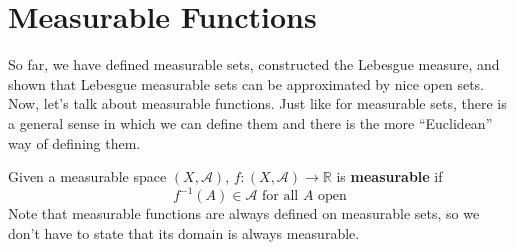 \section{Measurable Functions}

  So far, we have defined measurable sets, constructed the Lebesgue measure, and shown that Lebesgue measurable sets can be approximated by nice open sets. Now, let's talk about measurable functions. Just like for measurable sets, there is a general sense in which we can define them and there is the more ``Euclidean'' way of defining them. 

  \begin{definition}
    Given a measurable space $(X, \mathcal{A})$, $f: (X, \mathcal{A}) \longrightarrow \mathbb{R}$ is \textbf{measurable} if 
    \begin{equation}
      f^{-1}(A) \in \mathcal{A} \text{ for all } A \text{ open}
    \end{equation}
    Note that measurable functions are always defined on measurable sets, so we don't have to state that its domain is always measurable. 
  \end{definition}

